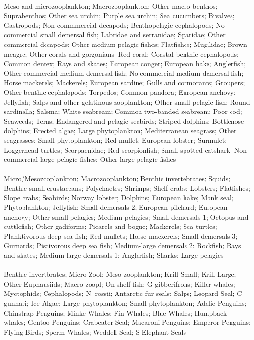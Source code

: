  \\
\hline
Meso and microzooplankton; Macrozooplankton; Other macro-benthos; Suprabenthos; Other sea urchin; Purple sea urchin; Sea cucumbers; Bivalves; Gastropods; Non-commmercial decapods; Benthopelagic cephalopods; No commercial small demersal fish; Labridae and serranidae; Sparidae; Other commercial decapods; Other medium pelagic fishes; Flatfishes; Mugilidae; Brown meagre; Other corals and gorgonians; Red coral; Coastal benthic cephalopods; Common dentex; Rays and skates; European conger; European hake; Anglerfish; Other commercial medium demersal fish; No commercial medium demersal fish; Horse mackerels; Mackerels; European sardine; Gulls and cormorants; Groupers; Other benthic cephalopods; Torpedos; Common pandora; European anchovy; Jellyfish; Salps and other gelatinous zooplankton; Other small pelagic fish; Round sardinella; Salema; White seabream; Common two-banded seabream; Poor cod; Seaweeds; Terns; Endangered and pelagic seabirds; Striped dolphins; Bottlenose dolphins; Erected algae; Large phytoplankton; Mediterranean seagrass; Other seagrasses; Small phytoplankton; Red mullet; European lobster; Surmulet; Loggerhead turtles; Scorpaenidae; Red scorpionfish; Small-spotted catshark; Non-commercial large pelagic fishes; Other large pelagic fishes\\
\fullhline
\hline
{} \\
\hline
Micro/Mesozooplankton; Macrozooplankton; Benthic invertebrates; Squids; Benthic small crustaceans; Polychaetes; Shrimps; Shelf crabs; Lobsters; Flatfishes; Slope crabs; Seabirds; Norway lobster; Dolphins; European hake; Monk seal; Phytoplankton; Jellyfish; Small demersals 2; European pilchard; European anchovy; Other small pelagics; Medium pelagics; Small demersals 1; Octopus and cuttlefish; Other gadiforms; Picarels and bogue; Mackerels; Sea turtles; Planktivorous deep sea fish; Red mullets; Horse mackerels; Small demersals 3; Gurnards; Piscivorous deep sea fish; Medium-large demersals 2; Rockfish; Rays and skates; Medium-large demersals 1; Anglerfish; Sharks; Large pelagics\\
\fullhline
\hline
{} \\
\hline
Benthic invertbrates; Micro-Zool; Meso zooplankton; Krill Small; Krill Large; Other Euphausiids; Macro-zoopl; On-shelf fish; G gibberifrons; Killer whales; Myctophids; Cephalopods; N. rossii; Antarctic fur seals; Salps; Leopard Seal; C gunnari; Ice Algae; Large phytoplankton; Small phytoplankton; Adelie Penguins; Chinstrap Penguins; Minke Whales; Fin Whales; Blue Whales; Humpback whales; Gentoo Penguins; Crabeater Seal; Macaroni Penguins; Emperor Penguins; Flying Birds; Sperm Whales; Weddell Seal; S Elephant Seals\\

